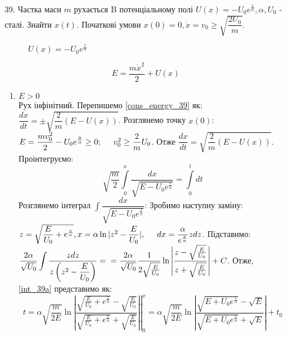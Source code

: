 \documentclass[a4paper,12pt]{article}
\newcommand\tab [1][0.5cm]{\hspace*{#1}}
\newcommand\dint{\displaystyle\int}
\begin{document}
\begin{justify}
\begin{itemize}
\begin{enumerate}
			\end{enumerate}
		\item [39.] Частка маси $m$ рухається B потенціальному полі $U(x)=-U_0e^{\frac{x}{\alpha}},\alpha,U_0$ - сталі. Знайти $x(t)$. Початкові умови  $x(0)=0,\dot{x}=v_0\geq\sqrt{\dfrac{2U_0}{m}}$.
			\begin{figure}[htp]
			\centering
			\caption{$U(x)=-U_0e^{\frac{x}{\alpha}}$}
			\label{plot_39}
			\end{figure}
			\begin{equation}
				E=\dfrac{m\dot{x}^2}{2}+U(x)
				\label{cons_energy_39}
			\end{equation}
			\begin{enumerate}[label=(\alph*)]
				\item $E>0$\\
					Рух інфінітний. Перепишемо \ref{cons_energy_39} як: $\dfrac{dx}{dt}=\pm\sqrt{\dfrac{2}{m}(E-U(x))}$. Розглянемо точку $x(0)$: $E=\dfrac{mv_0^2}{2}-U_0e^{\frac{0}{\alpha}}\geq0;\tab v_0^2\geq\dfrac{2}{m}U_0$. Отже $\dfrac{dx}{dt}=\sqrt{\dfrac{2}{m}(E-U(x))}$. Проінтегруємо:
					\begin{equation}
						\sqrt{\dfrac{m}{2}}\dint\limits_0^x\dfrac{dx}{\sqrt{E-U_0e^{\frac{x}{\alpha}}}}=\dint\limits_0^tdt
						\label{int_39a}
					\end{equation} 
					Розглянемо інтеграл $\dint\dfrac{dx}{\sqrt{E-U_0e^{\frac{x}{\alpha}}}}$: Зробимо наступну заміну: $z=\sqrt{\dfrac{E}{U_0}+e^{\frac{x}{\alpha}}},\\ x=\alpha\ln|z^2-\dfrac{E}{U_0}|,\tab dx=\dfrac{\alpha}{e^{\frac{x}{\alpha}}}zdz$. Підставимо: $\dfrac{2\alpha}{\sqrt{U_0}}\dint\dfrac{zdz}{z\left(z^2-\dfrac{E}{U_0}\right)}=\\=\dfrac{2\alpha}{\sqrt{U_0}}\dfrac{1}{2\sqrt{\frac{E}{U_0}}}\ln\left|\dfrac{z-\sqrt{\frac{E}{U_0}}}{z+\sqrt{\frac{E}{U_0}}}\right|+C$. Отже, \ref{int_39a} представимо як: 
					\begin{equation}
						t=\left.\alpha\sqrt{\dfrac{m}{2E}}\ln\left|\dfrac{\sqrt{\frac{E}{U_0}+e^{\frac{x}{\alpha}}}-\sqrt{\frac{E}{U_0}}}{\sqrt{\frac{E}{U_0}+e^{\frac{x}{\alpha}}}+\sqrt{\frac{E}{U_0}}}\right|\right|_0^x=\alpha\sqrt{\dfrac{m}{2E}}\ln\left|\dfrac{\sqrt{E+U_0e^{\frac{x}{\alpha}}}-\sqrt{E}}{\sqrt{E+U_0e^{\frac{x}{\alpha}}}+\sqrt{E}}\right|+t_0

\end{equation}
\end{enumerate}
\end{itemize}
\end{justify}
\end{document}
